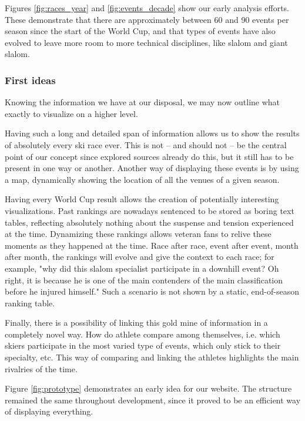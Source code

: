 Figures \ref{fig:races_year} and \ref{fig:events_decade} show our early analysis efforts.
These demonstrate that there are approximately between 60 and 90 events per season since the start of the World Cup, and that types of events have also evolved to leave more room to more technical disciplines, like slalom and giant slalom.

\newpage

\subsubsection{First ideas}

Knowing the information we have at our disposal, we may now outline what exactly to visualize on a higher level.

Having such a long and detailed span of information allows us to show the results of absolutely every ski race ever.
This is not -- and should not -- be the central point of our concept since explored sources already do this, but it still has to be present in one way or another.
Another way of displaying these events is by using a map, dynamically showing the location of all the venues of a given season.

Having every World Cup result allows the creation of potentially interesting visualizations.
Past rankings are nowadays sentenced to be stored as boring text tables, reflecting absolutely nothing about the suspense and tension experienced at the time.
Dynamizing these rankings allows veteran fans to relive these moments as they happened at the time.
Race after race, event after event, month after month, the rankings will evolve and give the context to each race; for example, "why did this slalom specialist participate in a downhill event?
Oh right, it is because he is one of the main contenders of the main classification before he injured himself."
Such a scenario is not shown by a static, end-of-season ranking table.

Finally, there is a possibility of linking this gold mine of information in a completely novel way.
How do athlete compare among themselves, i.e. which skiers participate in the most varied type of events, which only stick to their specialty, etc.
This way of comparing and linking the athletes highlights the main rivalries of the time.

Figure \ref{fig:prototype} demonstrates an early idea for our website.
The structure remained the same throughout development, since it proved to be an efficient way of displaying everything.

